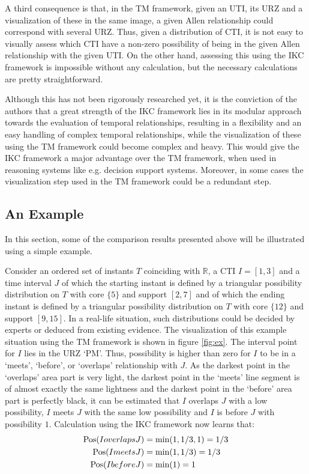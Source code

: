 A third consequence is that, in the TM framework, given an UTI, its URZ and a visualization of these in the same image, a given Allen relationship could correspond with several URZ. Thus, given a distribution of CTI, it is not easy to visually assess which CTI have a non-zero possibility of being in the given Allen relationship with the given UTI. On the other hand, assessing this using the IKC framework is impossible without any calculation, but the necessary calculations are pretty straightforward.

Although this has not been rigorously researched yet, it is the conviction of the authors that a great strength of the IKC framework lies in its modular approach towards the evaluation of temporal relationships, resulting in a flexibility and an easy handling of complex temporal relationships, while the visualization of these using the TM framework could become complex and heavy. This would give the IKC framework a major advantage over the TM framework, when used in reasoning systems like e.g. decision support systems. Moreover, in some cases the visualization step used in the TM framework could be a redundant step.

\subsection{\label{subsec:example}An Example}
In this section, some of the comparison results presented above will be illustrated using a simple example.

\begin{example}
Consider an ordered set of instants $T$ coinciding with $\mathbb{R}$, a CTI $I = \left[1, 3\right]$ and a time interval $J$ of which the starting instant is defined by a triangular possibility distribution on $T$ with core $\{5\}$ and support $\left[2, 7\right]$ and of which the ending instant is defined by a triangular possibility distribution on $T$ with core $\{12\}$ and support $\left[9, 15\right]$. In a real-life situation, such distributions could be decided by experts or deduced from existing evidence. The visualization of this example situation using the TM framework is shown in figure \ref{fig:ex}. The interval point for $I$ lies in the URZ `PM'. Thus, possibility is higher than zero for $I$ to be in a `meets', `before', or `overlaps' relationship with $J$. As the darkest point in the `overlaps' area part is very light, the darkest point in the `meets' line segment is of almost exactly the same lightness and the darkest point in the `before' area part is perfectly black, it can be estimated that $I$ overlaps $J$ with a low possibility, $I$ meets $J$ with the same low possibility and $I$ is before $J$ with possibility $1$. Calculation using the IKC framework now learns that:
\vspace{-5pt}
\begin{align}
\operatorname{Pos}(I overlaps J) & = \min(1, 1/3, 1) = 1/3 \nonumber \\
\operatorname{Pos}(I meets J) & = \min(1, 1/3) = 1/3\nonumber \\
\operatorname{Pos}(I before J) & = \min(1) = 1\nonumber
\end{align}
\end{example}
\vspace{-10pt}

